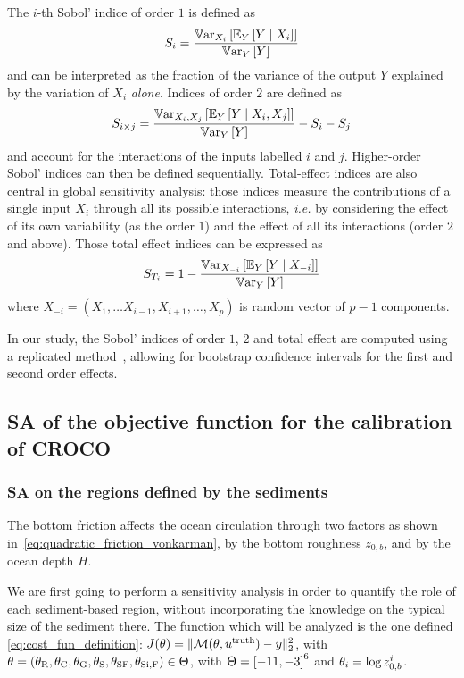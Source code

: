 \documentclass[../../Main_ManuscritThese.tex]{subfiles}
\newcommand{\zob}{z_{0,b}}
\begin{document}
The $i$-th Sobol' indice of order $1$ is defined
as~\cite{sobol_sensitivity_1993,sobol_global_2001}
\begin{equation}
  S_i = \frac{\mathbb{V}\mathrm{ar}_{X_i}\left[\mathbb{E}_{Y}\left[Y \mid X_i\right]\right]}{\mathbb{V}\mathrm{ar}_{Y}\left[Y\right]}
\end{equation}
and can be interpreted as the fraction of the variance of the output
$Y$ explained by the variation of $X_i$ \emph{alone}. Indices of
order $2$ are defined as
\begin{equation}
  S_{i\times j} = \frac{\mathbb{V}\mathrm{ar}_{X_i, X_j}\left[\mathbb{E}_{Y}\left[Y \mid X_i, X_j\right]\right]}{\mathbb{V}\mathrm{ar}_{Y}\left[Y\right]} - S_i -S_j
\end{equation}
and account for the interactions of the inputs labelled $i$ and $j$.
Higher-order Sobol' indices can then be defined
sequentially. Total-effect indices are also central in global
sensitivity analysis: those indices measure the contributions of a
single input $X_i$ through all its possible interactions,
\textit{i.e.} by considering the effect of its own variability (as the
order $1$) and the effect of all its interactions (order $2$ and
above). Those total effect indices can be expressed as
\begin{equation}
 S_{T_i} = 1 - \frac{\mathbb{V}\mathrm{ar}_{X_{-i}}\left[\mathbb{E}_{Y}\left[Y \mid X_{-i}\right]\right]}{\mathbb{V}\mathrm{ar}_{Y}\left[Y\right]}
\end{equation}
where $X_{-i} = (X_1,\dots X_{i-1},X_{i+1},\dots,X_p)$ is random vector of $p-1$ components.

In our study, the Sobol' indices of order $1$, $2$ and total effect
are computed using a replicated
method~\cite{gilquin_making_2019,gilquin_echantillonnages_2016},
allowing for bootstrap confidence intervals for the first and second
order effects.

\subsection{SA of the objective function for the calibration of CROCO}
\subsubsection{SA on the regions defined by the sediments}
The bottom friction affects the ocean circulation through two factors
as shown in~\cref{eq:quadratic_friction_vonkarman}, by the bottom
roughness $\zob$, and by the ocean depth $H$.

We are first going to perform a sensitivity analysis in order to
quantify the role of each sediment-based region, without incorporating
the knowledge on the typical size of the sediment there.  The function
which will be analyzed is the one defined
\cref{eq:cost_fun_definition}:
$J(\theta) = \|\mathcal{M}(\theta, u^{\mathrm{truth}}) - y \|_2^2$, with
$\theta =
(\theta_{\mathrm{R}},\theta_{\mathrm{C}},\theta_{\mathrm{G}},\theta_{\mathrm{S}},
\theta_{\mathrm{SF}},\theta_{\mathrm{Si,F}})\in\Theta$, with
$\Kspace = \interval{-11}{-3}^6$ and $\kk_i = \log \zob^i$.
\end{document}
